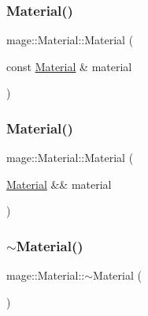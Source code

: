 \hypertarget{structmage_1_1_material_abed630412cdc4a6281389d128ec4b5f3}{}\label{structmage_1_1_material_abed630412cdc4a6281389d128ec4b5f3} 
\subsubsection{\texorpdfstring{Material()}{Material()}\hspace{0.1cm}{\footnotesize\ttfamily [2/3]}}
{\footnotesize\ttfamily mage\+::\+Material\+::\+Material (\begin{DoxyParamCaption}\item[{const \hyperlink{structmage_1_1_material}{Material} \&}]{material }\end{DoxyParamCaption})\hspace{0.3cm}{\ttfamily [default]}}

\hypertarget{structmage_1_1_material_a41bfbc2bfa16e3694ac443d390b804c2}{}\label{structmage_1_1_material_a41bfbc2bfa16e3694ac443d390b804c2} 
\subsubsection{\texorpdfstring{Material()}{Material()}\hspace{0.1cm}{\footnotesize\ttfamily [3/3]}}
{\footnotesize\ttfamily mage\+::\+Material\+::\+Material (\begin{DoxyParamCaption}\item[{\hyperlink{structmage_1_1_material}{Material} \&\&}]{material }\end{DoxyParamCaption})\hspace{0.3cm}{\ttfamily [default]}}

\hypertarget{structmage_1_1_material_a4ca65b7e24144ee08dd1ce8d0eda9284}{}\label{structmage_1_1_material_a4ca65b7e24144ee08dd1ce8d0eda9284} 
\subsubsection{\texorpdfstring{$\sim$\+Material()}{~Material()}}
{\footnotesize\ttfamily mage\+::\+Material\+::$\sim$\+Material (\begin{DoxyParamCaption}{ }\end{DoxyParamCaption})\hspace{0.3cm}{\ttfamily [default]}}




